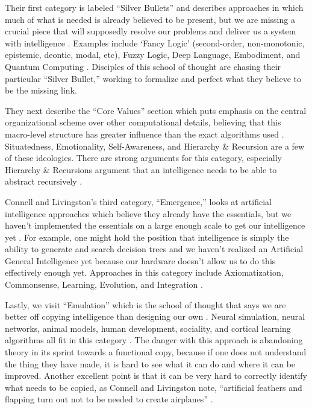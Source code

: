 \documentclass[oneside,12pt,openany]{book}
\begin{document}
	Their first category is labeled ``Silver Bullets'' and describes approaches in which much of what is needed is already believed to be present, but we are missing a crucial piece that will supposedly resolve our problems and deliver us a system with intelligence \cite{Connell}. Examples include `Fancy Logic' (second-order, non-monotonic, epistemic, deontic, modal, etc), Fuzzy Logic, Deep Language, Embodiment, and Quantum Computing \cite{Connell}. Disciples of this school of thought are chasing their particular ``Silver Bullet,'' working to formalize and perfect what they believe to be the missing link.
	
	They next describe the ``Core Values'' section which puts emphasis on the central organizational scheme over other computational details, believing that this macro-level structure has greater influence than the exact algorithms used \cite{Connell}. Situatedness, Emotionality, Self-Awareness, and Hierarchy \& Recursion are a few of these ideologies. There are strong arguments for this category, especially Hierarchy \& Recursions argument that an intelligence needs to be able to abstract recursively \cite{Connell}.
	
	Connell and Livingston's third category, ``Emergence,'' looks at artificial intelligence approaches which believe they already have the essentials, but we haven't implemented the essentials on a large enough scale to get our intelligence yet \cite{Connell}. For example, one might hold the position that intelligence is simply the ability to generate and search decision trees and we haven't realized an Artificial General Intelligence yet because our hardware doesn't allow us to do this effectively enough yet. Approaches in this category include Axiomatization, Commonsense, Learning, Evolution, and Integration \cite{Connell}.
	
	Lastly, we visit ``Emulation'' which is the school of thought that says we are better off copying intelligence than designing our own \cite{Connell}. Neural simulation, neural networks, animal models, human development, sociality, and cortical learning algorithms all fit in this category \cite{Connell}. The danger with this approach is abandoning theory in its sprint towards a functional copy, because if one does not understand the thing they have made, it is hard to see what it can do and where it can be improved. Another excellent point is that it can be very hard to correctly identify what needs to be copied, as Connell and Livingston note, ``artificial feathers and flapping turn out not to be needed to create airplanes'' \cite{Connell}.
	
\end{document}
